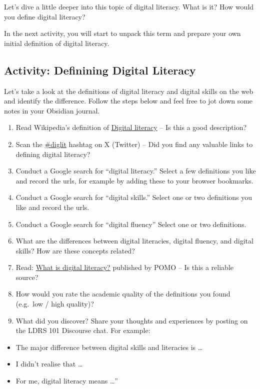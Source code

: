 \documentclass[
]{book}
\providecommand{\tightlist}{%
  \setlength{\itemsep}{0pt}\setlength{\parskip}{0pt}}
\theoremstyle{definition}
\theoremstyle{definition}
\theoremstyle{definition}
\theoremstyle{definition}
\theoremstyle{remark}
\begin{document}
Let's dive a little deeper into this topic of digital literacy. What is it? How would you define digital literacy?

In the next activity, you will start to unpack this term and prepare your own initial definition of digital literacy.

\hypertarget{activity-definining-digital-literacy}{%
\subsection*{Activity: Definining Digital Literacy}\label{activity-definining-digital-literacy}}

\begin{reflect}
Let's take a look at the definitions of digital literacy and digital skills on the web and identify the difference. Follow the steps below and feel free to jot down some notes in your Obsidian journal.

\begin{enumerate}
\def\labelenumi{\arabic{enumi}.}
\tightlist
\item
  Read Wikipedia's definition of \href{https://en.wikipedia.org/wiki/Digital_literacy}{Digital literacy} -- Is this a good description?
\item
  Scan the \href{https://twitter.com/i/flow/login?redirect_after_login=\%2Fhashtag\%2Fdiglit\%3Fs\%3D03}{\#diglit} hashtag on X (Twitter) -- Did you find any valuable links to defining digital literacy?
\item
  Conduct a Google search for ``digital literacy.'' Select a few definitions you like and record the urls, for example by adding these to your browser bookmarks.
\item
  Conduct a Google search for ``digital skills.'' Select one or two definitions you like and record the urls.
\item
  Conduct a Google search for ``digital fluency'' Select one or two definitions.
\item
  What are the differences between digital literacies, digital fluency, and digital skills? How are these concepts related?
\item
  Read: \href{http://pomo.com.au/blog/digital-literacy/}{What is digital literacy?} published by POMO -- Is this a reliable source?
\item
  How would you rate the academic quality of the definitions you found (e.g.~low / high quality)?
\item
  What did you discover? Share your thoughts and experiences by posting on the LDRS 101 Discourse chat. For example:
\end{enumerate}

\begin{itemize}
\tightlist
\item
  The major difference between digital skills and literacies is \ldots{}
\item
  I didn't realise that \ldots{}
\item
  For me, digital literacy means \ldots''
\end{itemize}
\end{reflect}
\end{document}
